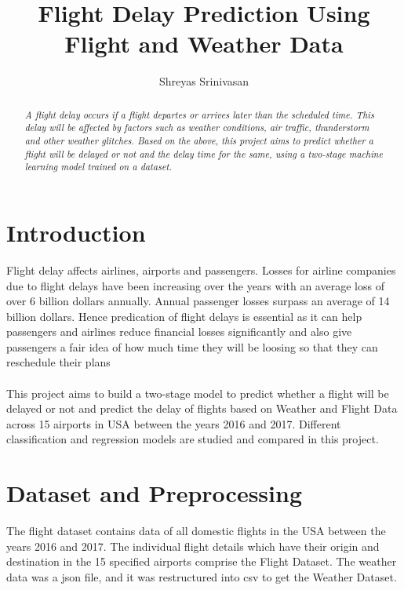 \documentclass[12pt,letter-paper]{article}
\begin{document}
\title{Flight Delay Prediction Using Flight and Weather Data}
\author{Shreyas Srinivasan}
\date{}
\maketitle

\begin{abstract}
    \textit{A flight delay occurs if a flight departes or arrives later than the scheduled time. This delay will be affected by factors such as weather conditions, air traffic, thunderstorm and other weather glitches. Based on the above, this project aims to predict whether a flight will be delayed or not and the delay time for the same, using a two-stage machine learning model trained on a dataset.}
\end{abstract}


\section{Introduction}

    Flight delay affects airlines, airports and passengers. Losses for airline companies due to flight delays have been increasing over the years with an average loss of over 6 billion dollars annually. Annual passenger losses surpass an average of 14 billion dollars. Hence predication of flight delays is essential as it can help passengers and airlines reduce financial losses significantly and also give passengers a fair idea of how much time they will be loosing so that they can reschedule their plans
    \paragraph{}
    
    This project aims to build a two-stage model to predict whether a flight will be delayed or not and predict the delay of flights based on Weather and Flight Data across 15 airports in USA between the years 2016 and 2017. Different classification and regression models are studied and compared in this project.
    
\section{Dataset and Preprocessing}
   
     The flight dataset contains data of all domestic flights in the USA between the years 2016 and 2017. The individual flight details which have their origin and destination in the 15 specified airports comprise the Flight Dataset. The weather data was a json file, and it was restructured into csv to get the Weather Dataset. 
\end{document}
